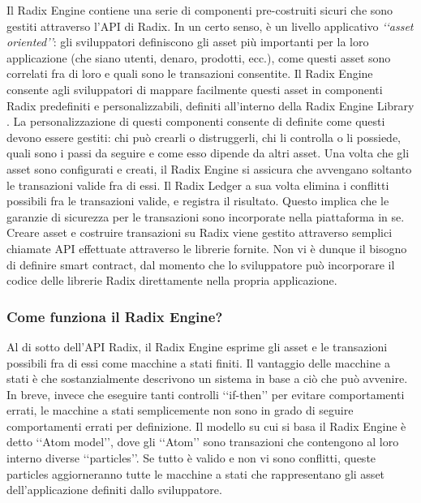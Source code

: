 Il Radix Engine \cite{K19} contiene una serie di componenti pre-costruiti sicuri che sono gestiti attraverso l'API di Radix. In un certo senso, è un livello applicativo \textit{‘‘asset oriented’’}: gli sviluppatori definiscono gli asset più importanti per la loro applicazione (che siano utenti, denaro, prodotti, ecc.), come questi asset sono correlati fra di loro e quali sono le transazioni consentite. Il Radix Engine consente agli sviluppatori di mappare facilmente questi asset in componenti Radix predefiniti e personalizzabili, definiti all'interno della Radix Engine Library \cite{K24}. La personalizzazione di questi componenti consente di definite come questi devono essere gestiti: chi può crearli o distruggerli, chi li controlla o li possiede, quali sono i passi da seguire e come esso dipende da altri asset. Una volta che gli asset sono configurati e creati, il Radix Engine si assicura che avvengano soltanto le transazioni valide fra di essi. Il Radix Ledger a sua volta elimina i conflitti possibili fra le transazioni valide, e registra il risultato. Questo implica che le garanzie di sicurezza per le transazioni sono incorporate nella piattaforma in se.
Creare asset e costruire transazioni su Radix viene gestito attraverso semplici chiamate API effettuate attraverso le librerie fornite. Non vi è dunque il bisogno di definire smart contract, dal momento che lo sviluppatore può incorporare il codice delle librerie Radix direttamente nella propria applicazione.

\subsubsection{Come funziona il Radix Engine?}

Al di sotto dell'API Radix, il Radix Engine esprime gli asset e le transazioni possibili fra di essi come macchine a stati finiti. Il vantaggio delle macchine a stati è che sostanzialmente descrivono un sistema in base a ciò che può avvenire. In breve, invece che eseguire tanti controlli ‘‘if-then’’ per evitare comportamenti errati, le macchine a stati semplicemente non sono in grado di seguire comportamenti errati per definizione. Il modello su cui si basa il Radix Engine è detto ‘‘Atom model’’, dove gli ‘‘Atom’’ sono transazioni che contengono al loro interno diverse ‘‘particles’’. Se tutto è valido e non vi sono conflitti, queste particles aggiorneranno tutte le macchine a stati che rappresentano gli asset dell'applicazione definiti dallo sviluppatore. 

